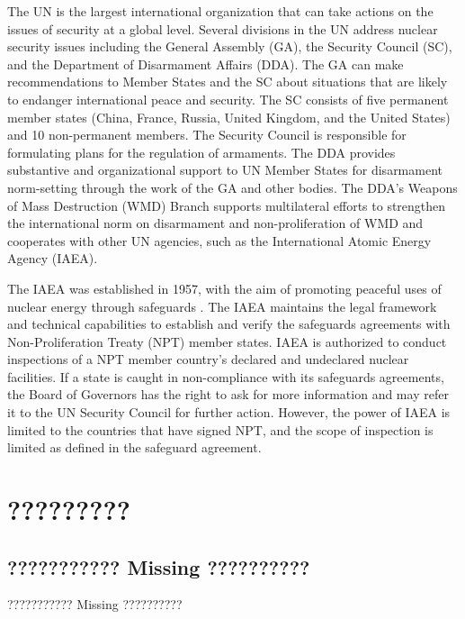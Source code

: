 \documentclass{report}
\begin{document}
The UN is the largest international organization that can take actions on the issues of security at a global level. Several divisions in the UN address nuclear security issues including the General Assembly (GA), the Security Council (SC), and the Department of Disarmament Affairs (DDA). The GA can make recommendations to Member States and the SC about situations that are likely to endanger international peace and security. The SC consists of five permanent member states (China, France, Russia, United Kingdom, and the United States) and 10 non-permanent members. The Security Council is responsible for formulating plans for the regulation of armaments. The DDA provides substantive and organizational support to UN Member States for disarmament norm-setting through the work of the GA and other bodies. The DDA's Weapons of Mass Destruction (WMD) Branch supports multilateral efforts to strengthen the international norm on disarmament and non-proliferation of WMD and cooperates with other UN agencies, such as the International Atomic Energy Agency (IAEA).

The IAEA was established in 1957, with the aim of promoting peaceful uses of nuclear energy through safeguards \cite{InternationalAtomicEnergyAgency}. The IAEA maintains the legal framework and technical capabilities to establish and verify the safeguards agreements with Non-Proliferation Treaty (NPT) member states. IAEA is authorized to conduct inspections of a NPT member country's declared and undeclared nuclear facilities. If a state is caught in non-compliance with its safeguards agreements, the Board of Governors has the right to ask for more information and may refer it to the UN Security Council for further action. However, the power of IAEA is limited to the countries that have signed NPT, and the scope of inspection is limited as defined in the safeguard agreement. 








\chapter[Appendix H: ????????]{?????????} \label{app:relations_table}


\section{???????????  Missing ??????????}
 
???????????  Missing ??????????






\newpage
\pagestyle{fancyTOC}




\thispagestyle{fancyTOC}
\end{document}
